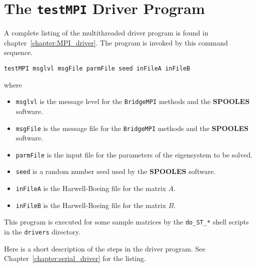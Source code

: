 \section{The \texttt{testMPI} Driver Program}
\label{section:BridgeMPI:driver}
\par
A complete listing of the multithreaded driver program is
found in chapter~\ref{chapter:MPI_driver}.
The program is invoked by this command sequence.
\begin{verbatim}
testMPI msglvl msgFile parmFile seed inFileA inFileB
\end{verbatim}
where
\begin{itemize}
\item 
{\tt msglvl} is the message level for the {\tt BridgeMPI}
methods and the {\bf SPOOLES} software.
\item 
{\tt msgFile} is the message file for the {\tt BridgeMPI}
methods and the {\bf SPOOLES} software.
\item 
{\tt parmFile} is the input file for the parameters of the
eigensystem to be solved.
\item 
{\tt seed} is a random number seed
used by the {\bf SPOOLES} software.
\item 
{\tt inFileA} is the Harwell-Boeing file for the matrix $A$.
\item 
{\tt inFileB} is the Harwell-Boeing file for the matrix $B$.
\end{itemize}
This program is executed for some sample matrices by the
{\tt do\_ST\_*} shell scripts in the {\tt drivers} directory.
\par
Here is a short description of the steps in the driver program.
See Chapter~\ref{chapter:serial_driver} for the listing.
